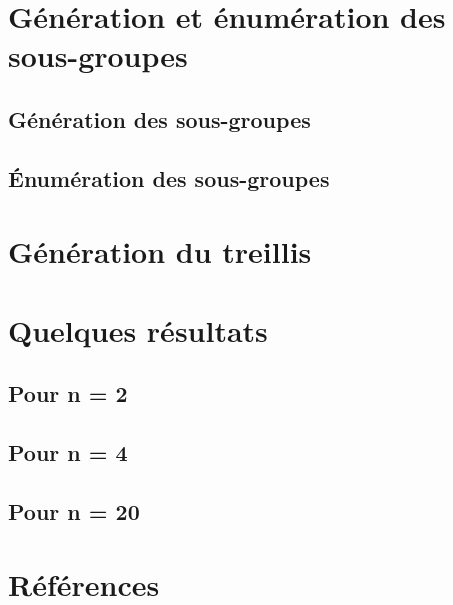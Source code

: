 \documentclass[11pt]{article}
\begin{document}

\section {Génération et énumération des sous-groupes}
\subsection{Génération des sous-groupes}
\subsection{Énumération des sous-groupes}

\section{Génération du treillis}

\section{Quelques résultats}
\subsection{Pour n = 2}
\subsection{Pour n = 4}
\subsection{Pour n = 20}


\section{Références}
\end{document}
